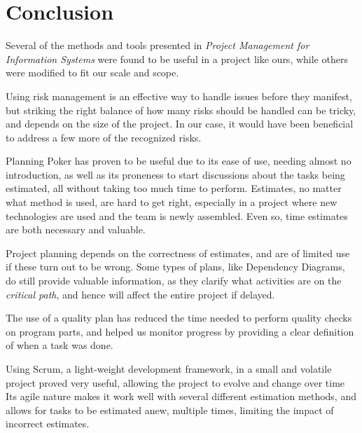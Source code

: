 \section{Conclusion}

Several of the methods and tools presented in \emph{Project Management for
Information Systems}\cite{caye} were found to be useful in a project like ours,
while others were modified to fit our scale and scope.

Using risk management is an effective way to handle issues before they
manifest, but striking the right balance of how many risks should be handled
can be tricky, and depends on the size of the project. In our case, it would
have been beneficial to address a few more of the recognized risks.

Planning Poker has proven to be useful due to its ease of use, needing
almost no introduction, as well as its proneness to start discussions about the
tasks being estimated, all without taking too much time to perform.
Estimates, no matter what method is used, are hard to get right, especially
in a project where new technologies are used and the team is newly assembled.
Even so, time estimates are both necessary and valuable.

Project planning depends on the correctness of estimates, and are of limited use
if these turn out to be wrong. Some types of plans, like Dependency Diagrams, do
still provide valuable information, as they clarify what activities are on the
\emph{critical path}, and hence will affect the entire project if delayed.

The use of a quality plan has reduced the time needed to perform quality checks
on program parts, and helped us monitor progress by providing a clear
definition of when a task was done.

Using Scrum, a light-weight development framework, in a small and volatile
project proved very useful, allowing the project to evolve and change over time
Its agile nature makes it work well with several different estimation methods,
and allows for tasks to be estimated anew, multiple times, limiting the impact
of incorrect estimates.
